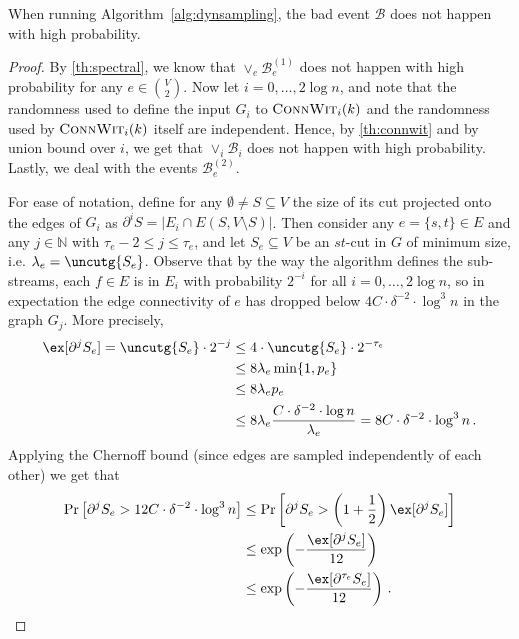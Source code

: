 \begin{lemma}
	\label{lem:failsampling}
	When running Algorithm~\ref{alg:dynsampling}, the bad event $\mathcal{B}$ does not happen with high probability.
\end{lemma}
\begin{proof}
	By \cref{th:spectral}, we know that $\vee_{e} \mathcal{B}^{(1)}_e$ does not happen with high probability for any $e \in \binom{V}{2}$. Now let $i=0,\dots, 2 \log n$, and note that the randomness used to define the input $G_i$ to $\textsc{ConnWit}_i(k)$ and the randomness used by $\textsc{ConnWit}_i(k)$ itself are independent. Hence, by \cref{th:connwit} and by union bound over $i$, we get that $\vee_{i}\mathcal{B}_i$ does not happen with high probability.  Lastly, we deal with the events $\mathcal{B}^{(2)}_e$.
	
	For ease of notation, define for any $\emptyset \neq S \subseteq V$ the size of its cut projected onto the edges of $G_i$ as $\partial^i S=|E_i \cap E(S,V \setminus S)|$. Then consider any $e=\{s,t\} \in E$ and any $j  \in \mathbb{N}$ with $\tau_e-2 \le j \le \tau_e$, and let $S_e \subseteq V$ be an $st$-cut in $G$ of minimum size, i.e. $\lambda_e = \uncutg{S_e}$. Observe that by the way the algorithm defines the sub-streams, each $f \in E$ is in $E_i$ with probability $2^{-i}$ for all $i=0, \dots, 2 \log n$, so in expectation the edge connectivity of $e$ has dropped below $4 C \cdot \delta^{-2}\cdot \log^3 n$ in the graph $G_{j}$. More precisely,
	\begin{align*}
		\ex[\partial^{j} S_e] = \uncutg{S_e} \cdot 2^{-j} & \le 4\cdot \uncutg{S_e} \cdot 2^{-\tau_e} \\
		&  \le 8\lambda_e \min\{1,  p_e\} \\
		& \le 8\lambda_e p_e  \\
		& \le 8 \lambda_e \frac{C \cdot \delta^{-2}\cdot \log n}{\lambda_e} = 8 C \cdot \delta^{-2}\cdot \log^3 n \, .
	\end{align*}
	Applying the Chernoff bound (since edges are sampled independently of each other)  we get that
	\begin{align*}
		\Pr\left[\partial^{j} S_e > 12 C \cdot \delta^{-2}\cdot \log^3 n \right] & \le \Pr\left[\partial^{j} S_e > \left(1+\frac{1}{2}\right) \ex[\partial^{j} S_e] \right] \\
		& \le \exp\left(-\frac{\ex[\partial^{j} S_e]}{12}\right) \\
		& \le \exp\left(-\frac{\ex[\partial^{\tau_e} S_e]}{12}\right)\, .
	\end{align*}

\end{proof}
